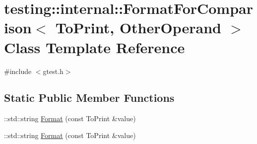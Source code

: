 \hypertarget{classtesting_1_1internal_1_1_format_for_comparison}{\section{testing\-:\-:internal\-:\-:Format\-For\-Comparison$<$ To\-Print, Other\-Operand $>$ Class Template Reference}
\label{classtesting_1_1internal_1_1_format_for_comparison}
}


{\ttfamily \#include $<$gtest.\-h$>$}

\subsection*{Static Public Member Functions}
\begin{DoxyCompactItemize}
\item 
\-::std\-::string \hyperlink{classtesting_1_1internal_1_1_format_for_comparison_a2aeb688fc55b57abd3021d82eccad896}{Format} (const To\-Print \&value)
\item 
\-::std\-::string \hyperlink{classtesting_1_1internal_1_1_format_for_comparison_a2aeb688fc55b57abd3021d82eccad896}{Format} (const To\-Print \&value)
\end{DoxyCompactItemize}


